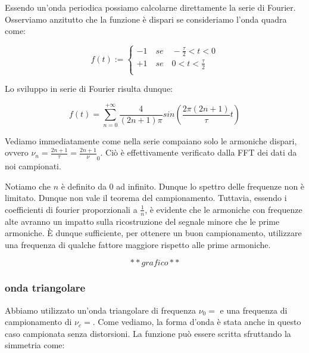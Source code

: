 Essendo un'onda periodica possiamo calcolarne direttamente la serie di Fourier. Osserviamo anzitutto che la funzione è dispari se consideriamo l'onda quadra come: 

\begin{displaymath}
f(t):=
\begin{cases}
-1 \quad se \quad -\frac{\tau}{2}<t<0 \\
+1 \quad se \quad 0<t<\frac{\tau}{2} \\ 
\end{cases}
\end{displaymath}

Lo sviluppo in serie di Fourier risulta dunque: 

\begin{equation}
f(t)=\sum_{n=0}^{+\infty}\frac{4}{(2n+1)\pi}sin (\frac{2\pi(2n+1)}{\tau}t)
\end{equation}

Vediamo immediatamente come nella serie compaiano solo le armoniche dispari, ovvero $\nu_n=\frac{2n+1}{\tau}=\frac{2n+1}\nu_0$. Ciò è effettivamente verificato dalla FFT dei dati da noi campionati.

Notiamo che $n$ è definito da 0 ad infinito. Dunque lo spettro delle frequenze non è limitato. Dunque non vale il teorema del campionamento. Tuttavia, essendo i coefficienti di fourier proporzionali a $\frac{1}{n}$, è evidente che le armoniche con frequenze alte avranno un impatto sulla ricostruzione del segnale minore che le prime armoniche. È dunque sufficiente, per ottenere un buon campionamento, utilizzare una frequenza di qualche fattore maggiore rispetto alle prime armoniche. 





$$**grafico**$$


\subsubsection{onda triangolare}
Abbiamo utilizzato un'onda triangolare di frequenza $\nu_0=$ e una frequenza di campionamento di $\nu_c=$. Come vediamo, la forma d'onda è stata anche in questo caso campionata senza distorsioni. La funzione può essere scritta sfruttando la simmetria come:

